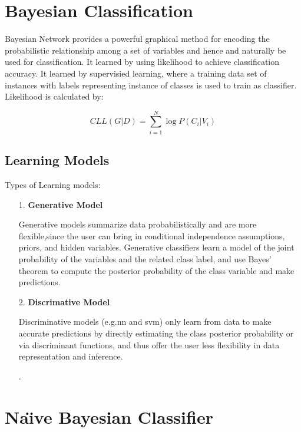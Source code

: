 \section{Bayesian Classification}
\par
Bayesian Network provides a powerful graphical method for encoding the probabilistic relationship among a set of variables and hence and naturally be used for classification. It learned by using likelihood to achieve classification accuracy. It learned by supervisied learning, where a  training data set of instances with labels representing instance of classes is used to train as classifier.\cite{garg2013design}
\linebreak Likelihood is calculated by:

\[CLL (G|D)=\sum_{i=1}^{N}\log P(C_i|V_i) \]
\newpage
\par
\subsection{Learning Models}
\par 
Types of Learning models:
\begin{enumerate}
\item[1.] \textbf{Generative Model}
\par
Generative models summarize data probabilistically and are more flexible,since the user can bring in conditional independence assumptions, priors, and hidden variables. Generative classifiers learn a model of the joint probability of the variables and the related class label, and use Bayes’ theorem to compute the posterior probability of the class variable and make predictions. 

\item[2.] \textbf{Discrimative Model}
\par
Discriminative models (e.g.\acs{nn} and \acs{svm}) only learn from data to make accurate predictions by directly estimating the class posterior probability or via discriminant functions, and thus offer the user less flexibility in data representation and inference.
\item[.] 
\end{enumerate}
\section{Na\"{\i}ve Bayesian Classifier}

